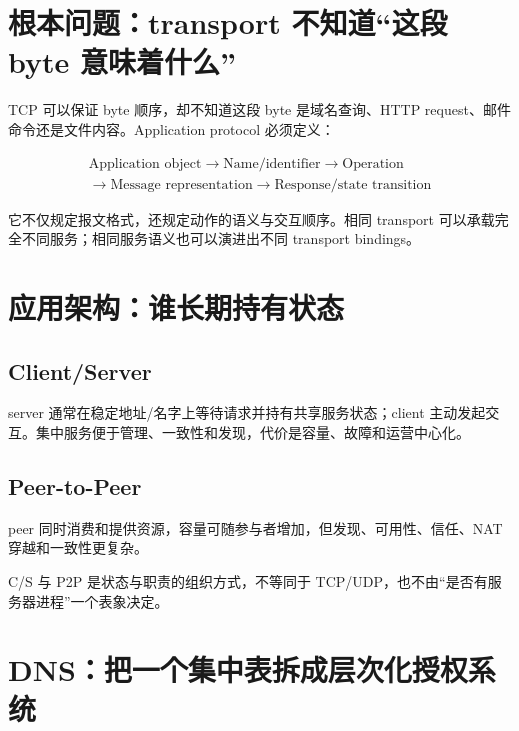 \documentclass[UTF8,fontset=none,11pt,a4paper]{ctexart}
\begin{document}
\section{根本问题：transport 不知道``这段 byte
意味着什么''}\label{1-ux6839ux672cux95eeux9898transport-ux4e0dux77e5ux9053ux8fd9ux6bb5-byte-ux610fux5473ux7740ux4ec0ux4e48}

TCP 可以保证 byte 顺序，却不知道这段 byte 是域名查询、HTTP
request、邮件命令还是文件内容。Application protocol 必须定义：

\[
\boxed{\begin{gathered}
\text{Application object}\to\text{Name/identifier}\to\text{Operation}\\
\to\text{Message representation}\to\text{Response/state transition}
\end{gathered}}
\]

它不仅规定报文格式，还规定动作的语义与交互顺序。相同 transport
可以承载完全不同服务；相同服务语义也可以演进出不同 transport bindings。

\section{应用架构：谁长期持有状态}\label{2-ux5e94ux7528ux67b6ux6784ux8c01ux957fux671fux6301ux6709ux72b6ux6001}

\subsection{Client/Server}\label{21-clientserver}

server 通常在稳定地址/名字上等待请求并持有共享服务状态；client
主动发起交互。集中服务便于管理、一致性和发现，代价是容量、故障和运营中心化。

\subsection{Peer-to-Peer}\label{22-peer-to-peer}

peer 同时消费和提供资源，容量可随参与者增加，但发现、可用性、信任、NAT
穿越和一致性更复杂。

C/S 与 P2P 是状态与职责的组织方式，不等同于
TCP/UDP，也不由``是否有服务器进程''一个表象决定。

\section{DNS：把一个集中表拆成层次化授权系统}\label{3-dnsux628aux4e00ux4e2aux96c6ux4e2dux8868ux62c6ux6210ux5c42ux6b21ux5316ux6388ux6743ux7cfbux7edf}
\end{document}
